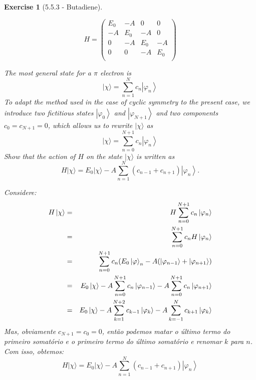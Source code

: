 \documentclass[12pt]{article}
\def\be{\begin{equation}}
\def\ee{\end{equation}}
\def\bea{\begin{eqnarray*}}
\def\eea{\end{eqnarray*}}
\newtheorem{exercise}{Exercise}
\begin{document}
\begin{exercise}[5.5.3 - Butadiene]
\begin{exercises}
\begin{multianswer}
				\be
					H = 
					\begin{pmatrix}
						E_0 & -A & 0 & 0 \\
						-A & E_0 & -A & 0 \\
						0 & -A  & E_0 & -A \\
						0 & 0 & -A & E_0 \\
					\end{pmatrix}
				\ee
			\end{multianswer}
			\item The most general state for a $\pi$ electron is
			$$
			|\chi\rangle=\sum_{n=1}^{N} c_{n}\left|\varphi_{n}\right\rangle
			$$
			To adapt the method used in the case of cyclic symmetry to the present case, we introduce two fictitious states $\left|\varphi_{0}\right\rangle$ and $\left|\varphi_{N+1}\right\rangle$ and two components $c_{0}=c_{N+1}=0$, which allows us to rewrite $|\chi\rangle$ as
			$$
			|\chi\rangle=\sum_{n=0}^{N+1} c_{n}\left|\varphi_{n}\right\rangle
			$$
			Show that the action of $H$ on the state $|\chi\rangle$ is written as
			$$
			H|\chi\rangle=E_{0}|\chi\rangle-A \sum_{n=1}^{N}\left(c_{n-1}+c_{n+1}\right)\left|\varphi_{n}\right\rangle .
			$$
			\begin{multianswer}
				Considere:
				\bea
					H\ket{\chi} &=& H\sum_{n=0}^{N+1} c_n\ket{\varphi_n} \\
						&=& \sum_{n=0}^{N+1} c_n H\ket{\varphi_n} \\
						&=& \sum_{n=0}^{N+1} c_n (E_0\ket{\varphi}_n - A(\ket{\varphi_{n-1}} + \ket{\varphi_{n+1}}) \\
						&=& E_0\ket{\chi} - A\sum_{n=0}^{N+1} c_n\ket{\varphi_{n-1}} -A\sum_{n=0}^{N+1} c_n\ket{\varphi_{n+1}} \\
						&=& E_0\ket{\chi} -A\sum_{k=1}^{N+2} c_{k-1}\ket{\varphi_k} - A\sum_{k=-1}^{N} c_{k+1}\ket{\varphi_k}
				\eea
				Mas, obviamente $c_{N+1} = c_0 = 0$, então podemos matar o último termo do primeiro somatório e o primeiro termo do último somatório e renomar $k$ para $n$. Com isso, obtemos:
				\be
					H|\chi\rangle=E_{0}|\chi\rangle-A \sum_{n=1}^{N}\left(c_{n-1}+c_{n+1}\right)\left|\varphi_{n}\right\rangle
				\ee
			\end{multianswer}
			

\end{exercises}
\end{exercise}
\end{document}
